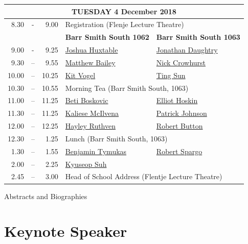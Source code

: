 \documentclass[twoside,14pt,a4paper,notitlepage]{memoir}
\begin{document}
\pagebreak
\vspace*{0cm}
\begin{center}
\begin{tabular}{rcr|p{3.6cm}|p{3.6cm}}
\multicolumn{5}{c}{{\large TUESDAY 4 December 2018}} \\ \hline
8.30 & - & 9.00 & \multicolumn{2}{l}{Registration (Flenje Lecture Theatre)} \\ \hline
 & & & \textbf{Barr Smith South 1062} & \textbf{Barr Smith South 1063} \\ \hline
9.00 & - & 9.25 &
 \hyperref[aut:huxtable]{Joshua Huxtable} &
 \hyperref[aut:daughtry]{Jonathan Daughtry} \\ \hline
9.30 & – & 9.55 &
 \hyperref[aut:bailey]{Matthew Bailey} &
 \hyperref[aut:crowhurst]{Nick Crowhurst} \\ \hline
10.00 & – & 10.25 &
\hyperref[aut:vogel]{Kit Vogel} &
\hyperref[aut:sun]{Ting Sun} \\ \hline
10.30 & – & 10.55 & \multicolumn{2}{l}{Morning Tea (Barr Smith South, 1063)} \\ \hline
11.00 & – & 11.25 & 
 \hyperref[aut:boskovic]{Beti Boskovic} &
 \hyperref[aut:hoskin]{Elliot Hoskin} \\ \hline
11.30 & – & 11.25 &
 \hyperref[aut:mcilvena]{Kaliese McIlvena} &
 \hyperref[aut:johnson]{Patrick Johnson} \\ \hline
12.00 & – & 12.25 &
 \hyperref[aut:ruthven]{Hayley Ruthven} &
 \hyperref[aut:button]{Robert Button} \\ \hline
12.30 & – & 1.25 & \multicolumn{2}{l}{Lunch (Barr Smith South, 1063)} \\ \hline
1.30 & – & 1.55 &
 \hyperref[aut:tymukas]{Benjamin Tymukas} &
 \hyperref[aut:spargo]{Robert Spargo} \\ \hline
2.00 & – & 2.25 & 
\hyperref[aut:suh]{Kyuseop Suh} & \\ \hline
2.45 & – & 3.00 & \multicolumn{2}{l}{Head of School Address (Flentje Lecture Theatre)} \\ \hline
\end{tabular}
\end{center}





\pagebreak
\vspace*{2cm}
{\Huge Abstracts and Biographies}
\vspace{2cm}

\section*{Keynote Speaker}
\end{document}
